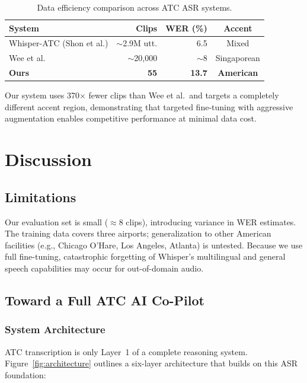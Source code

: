 \documentclass[11pt,a4paper]{article}
\begin{document}
\begin{table}[h]
\centering
\caption{Data efficiency comparison across ATC ASR systems.}
\begin{tabular}{lrrc}
\toprule
\textbf{System} & \textbf{Clips} & \textbf{WER (\%)} & \textbf{Accent} \\
\midrule
Whisper-ATC (Shon et al.)  & $\sim$2.9M utt. & 6.5 & Mixed \\
Wee et al.\ \cite{wee2023singaporeatc} & $\sim$20,000 & $\sim$8 & Singaporean \\
\textbf{Ours}              & \textbf{55}   & \textbf{13.7} & \textbf{American} \\
\bottomrule
\end{tabular}
\end{table}

Our system uses 370$\times$ fewer clips than Wee et al.\ and targets a
completely different accent region, demonstrating that targeted fine-tuning
with aggressive augmentation enables competitive performance at minimal data cost.

\section{Discussion}
\label{sec:discussion}

\subsection{Limitations}

Our evaluation set is small ($\approx$8 clips), introducing variance in WER
estimates.
The training data covers three airports; generalization to other American
facilities (e.g., Chicago O'Hare, Los Angeles, Atlanta) is untested.
Because we use full fine-tuning, catastrophic forgetting of Whisper's
multilingual and general speech capabilities may occur for out-of-domain audio.

\subsection{Toward a Full ATC AI Co-Pilot}

\subsubsection{System Architecture}

ATC transcription is only Layer~1 of a complete reasoning system.
Figure~\ref{fig:architecture} outlines a six-layer architecture that builds
on this ASR foundation:
\end{document}
